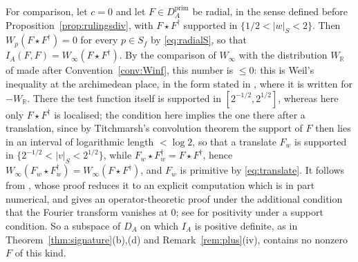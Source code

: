 \documentclass[11pt]{amsart}
\theoremstyle{definition}
\theoremstyle{remark}
\newcommand{\R}{\mathbb R}
\newcommand{\DA}{D_A}
\begin{document}
For comparison, let $c=0$ and let $F\in\DA^{\mathrm{prim}}$ be radial, in the
sense defined before Proposition~\ref{prop:rulingsdiv}, with
$F\star F^{\dagger}$ supported in $\{1/2<|w|_S<2\}$.  Then
$W_p(F\star F^{\dagger})=0$ for every $p\in S_f$ by \eqref{eq:radialS}, so
that $I_A(F,F)=W_{\infty}(F\star F^{\dagger})$.  By the comparison of
$W_{\infty}$ with the distribution $W_{\R}$ of \cite{CCWeilArch} made after
Convention~\ref{conv:Winf}, this number is $\le0$: this is Weil's inequality
at the archimedean place, in the form stated in
\cite[Introduction]{CCWeilArch}, where it is written for $-W_{\R}$.  There
the test function itself is supported in $[2^{-1/2},2^{1/2}]$, whereas here only
$F\star F^{\dagger}$ is localised; the condition here implies the one there after a
translation, since by Titchmarsh's convolution theorem the support of $F$ then
lies in an interval of logarithmic length $<\log2$, so that a translate $F_w$ is
supported in $\{2^{-1/2}<|v|_S<2^{1/2}\}$, while
$F_w\star F_w^{\dagger}=F\star F^{\dagger}$, hence
$W_{\infty}(F_w\star F_w^{\dagger})=W_{\infty}(F\star F^{\dagger})$, and
$F_w$ is primitive by \eqref{eq:translate}.  It
follows from \cite[Theorem~1]{Yoshida}, whose proof reduces it to an explicit
computation which is in part numerical, and \cite[Theorem~1]{CCWeilArch}
gives an operator-theoretic proof under the additional condition that the
Fourier transform vanishes at $0$; see \cite{Bombieri,BurnolCR} for positivity under a
support condition.  So a subspace of $\DA$ on which $I_A$
is positive definite, as in Theorem~\ref{thm:signature}(b),(d) and
Remark~\ref{rem:plus}(iv), contains no nonzero $F$ of this kind.
\end{document}
